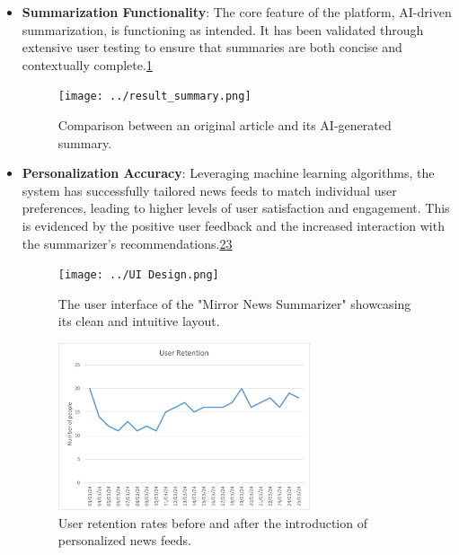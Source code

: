 \documentclass[10pt]{article}
\begin{document}
\begin{itemize}
    \item \textbf{Summarization Functionality}: The core feature of the platform, AI-driven summarization, is functioning as intended. It has been validated through extensive user testing to ensure that summaries are both concise and contextually complete.\ref{fig:result_summary}
    
    \begin{figure}[H]
        \centering
        \texttt{[image: ../result\_summary.png]}
        \caption{Comparison between an original article and its AI-generated summary.}
        \label{fig:result_summary}
    \end{figure}

    \newpage
    \item \textbf{Personalization Accuracy}: Leveraging machine learning algorithms, the system has successfully tailored news feeds to match individual user preferences, leading to higher levels of user satisfaction and engagement. This is evidenced by the positive user feedback and the increased interaction with the summarizer's recommendations.\ref{fig:ui_design}\ref{fig:user_retention}

    \begin{figure}[H]
        \centering
        \texttt{[image: ../UI Design.png]}
        \caption{The user interface of the "Mirror News Summarizer" showcasing its clean and intuitive layout.}
        \label{fig:ui_design}
    \end{figure}

    \begin{figure}[H]
        \centering
        \includegraphics[width=0.7\textwidth]{../user retention.png}
        \caption{User retention rates before and after the introduction of personalized news feeds.}
        \label{fig:user_retention}
    \end{figure}
    

\end{itemize}
\end{document}
